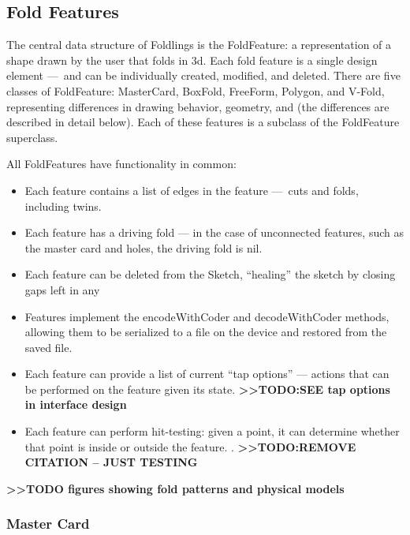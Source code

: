 \subsection{Fold Features}\label{fold-features}

The central data structure of Foldlings is the FoldFeature: a
representation of a shape drawn by the user that folds in 3d. Each fold
feature is a single design element ---~and can be individually created,
modified, and deleted. There are five classes of FoldFeature:
MasterCard, BoxFold, FreeForm, Polygon, and V-Fold, representing
differences in drawing behavior, geometry, and (the differences are
described in detail below). Each of these features is a subclass of the
FoldFeature superclass.

All FoldFeatures have functionality in common:

\begin{itemize}
\itemsep1pt\parskip0pt
\item
  Each feature contains a list of edges in the feature ---~cuts and
  folds, including twins.
\item
  Each feature has a driving fold --- in the case of unconnected
  features, such as the master card and holes, the driving fold is nil.
\item
  Each feature can be deleted from the Sketch, ``healing'' the sketch by
  closing gaps left in any
\item
  Features implement the encodeWithCoder and decodeWithCoder methods,
  allowing them to be serialized to a file on the device and restored
  from the saved file.
\item
  Each feature can provide a list of current ``tap options'' --- actions
  that can be performed on the feature given its state.
  \textbf{\textgreater{}\textgreater{}TODO:SEE tap options in interface
  design}
\item
  Each feature can perform hit-testing: given a point, it can determine
  whether that point is inside or outside the feature. \citep{Nobody06}.
  \textbf{\textgreater{}\textgreater{}TODO:REMOVE CITATION -- JUST
  TESTING}
\end{itemize}

\textbf{\textgreater{}\textgreater{}TODO figures showing fold patterns
and physical models}

\subsubsection{Master Card}\label{master-card}

